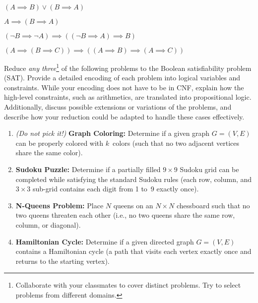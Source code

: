 \documentclass[a4paper,12pt]{article}
\begin{document}
\begin{tasks}
    \begin{multicols}{2}
    \begin{subtasks}
        \item $(A \implies B) \lor (B \implies A)$
        \item $A \implies (B \implies A)$
        \item $(\neg B \implies \neg A) \implies ((\neg B \implies A) \implies B)$
        \item $(A \implies (B \implies C)) \implies ((A \implies B) \implies (A \implies C))$
    \end{subtasks}
    \end{multicols}


    \item Reduce \emph{any three}\footnote{Collaborate with your classmates to cover distinct problems. Try to select problems from different domains.} of the following problems to the Boolean satisfiability problem (SAT).
    Provide a detailed encoding of each problem into logical variables and constraints.
    While your encoding does not have to be in CNF, explain how the high-level constraints, such as arithmetics, are translated into propositional logic.
    Additionally, discuss possible extensions or variations of the problems, and describe how your reduction could be adapted to handle these cases effectively.

    \begin{enumerate}[start=0]
        \item \emph{(Do not pick it!)} \textbf{Graph Coloring:} Determine if a given graph $G = (V, E)$ can be properly colored with $k$~colors (such that no two adjacent vertices share the same color).

        \item \textbf{Sudoku Puzzle:} Determine if a partially filled $9 \times 9$ Sudoku grid can be completed while satisfying the standard Sudoku rules (each row, column, and $3 \times 3$ sub-grid contains each digit from 1 to~9 exactly once).

        \item \textbf{N-Queens Problem:} Place $N$ queens on an $N \times N$ chessboard such that no two queens threaten each other (i.e., no two queens share the same row, column, or diagonal).

        \item \textbf{Hamiltonian Cycle:} Determine if a given directed graph $G = (V, E)$ contains a Hamiltonian cycle (a path that visits each vertex exactly once and returns to the starting vertex).


\end{enumerate}
\end{tasks}
\end{document}
